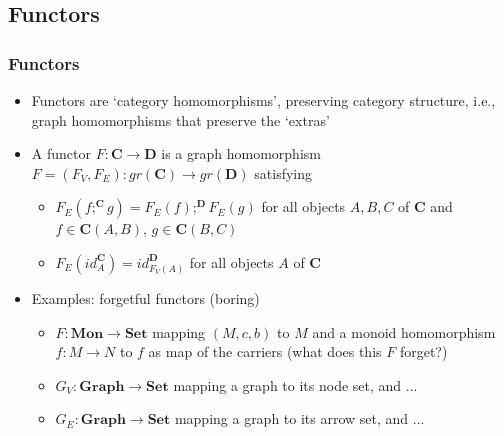 \documentclass[handout]{beamer}
\newcommand{\bfsf}[1]{{\boldsymbol{#1}}}
\newcommand{\Set}{\bfsf{Set}}
\newcommand{\Gra}{\bfsf{Graph}}
\newcommand{\CC}{\bfsf{C}}
\newcommand{\DD}{\bfsf{D}}
\newcommand{\Mon}{\bfsf{Mon}}
\begin{document}
\subsection{Functors}

\frame
  {   
    \frametitle{Functors}\label{Ch2:Functors}

 \begin{itemize}[<+->]
\item Functors are `category homomorphisms', preserving category structure,
i.e., graph homomorphisms that preserve the `extras'
\item A functor $F: \CC\to\DD$ is a graph homomorphism 
$F=(F_V,F_E): gr(\CC)\to gr(\DD)$ satisfying
   \begin{itemize}[<+->]
\item $F_E(f;^\CC g) = F_E(f);^\DD F_E(g)$ for all objects $A,B,C$ of $\CC$ 
and $f\in\CC(A,B)$, $g\in\CC(B,C)$
\item $F_E(id^\CC_A) = id^\DD_{F_V(A)}$ for all objects $A$ of $\CC$ 
   \end{itemize}
\item Examples: forgetful functors (boring) %
   \begin{itemize}[<+->]
\item $F: \Mon \to \Set$ mapping $(M,c,b)$ to $M$ and a monoid homomorphism
$f: M\to N$ to $f$ as map of the carriers (what does this $F$ forget?)
\item  $G_V: \Gra \to \Set$ mapping a graph to its node set, and ...
\item  $G_E: \Gra \to \Set$ mapping a graph to its arrow set, and ...
   \end{itemize}
 \end{itemize}

 }
\end{document}
